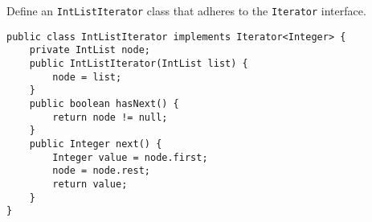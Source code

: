 \question Define an \lstinline$IntListIterator$ class that adheres to the
\lstinline$Iterator$ interface.

\begin{solution}[3in]
\begin{lstlisting}
public class IntListIterator implements Iterator<Integer> {
    private IntList node;
    public IntListIterator(IntList list) {
        node = list;
    }
    public boolean hasNext() {
        return node != null;
    }
    public Integer next() {
        Integer value = node.first;
        node = node.rest;
        return value;
    }
}
\end{lstlisting}
\end{solution}
